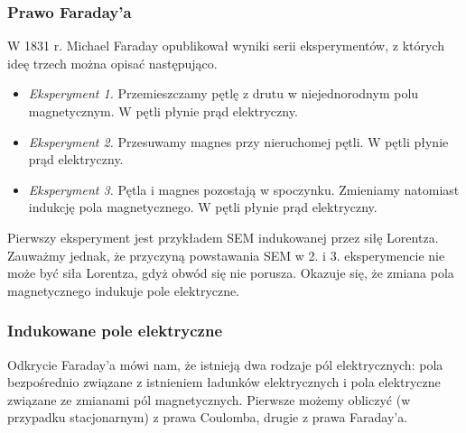 \documentclass[../main.tex]{subfiles}
\begin{document}
    \subsubsection*{Prawo Faraday'a}
    W 1831 r. Michael Faraday opublikował wyniki serii eksperymentów, z których ideę trzech można opisać następująco.
    \begin{itemize}
        \item \textit{Eksperyment 1.} Przemieszczamy pętlę z drutu w niejednorodnym polu magnetycznym. W pętli płynie prąd elektryczny.
        \item \textit{Eksperyment 2.} Przesuwamy magnes przy nieruchomej pętli. W pętli płynie prąd elektryczny.
        \item \textit{Eksperyment 3.} Pętla i magnes pozostają w spoczynku. Zmieniamy natomiast indukcję pola magnetycznego. W pętli płynie prąd elektryczny.
    \end{itemize}
    Pierwszy eksperyment jest przykładem SEM indukowanej przez siłę Lorentza. Zauważmy jednak, że przyczyną powstawania SEM w 2. i 3. eksperymencie nie może być siła Lorentza, gdyż obwód się nie porusza. Okazuje się, że zmiana pola magnetycznego indukuje pole elektryczne.
    \medskip
    
    \noindent{}
\medskip

\noindent{}

\subsubsection*{Indukowane pole elektryczne}
Odkrycie Faraday'a mówi nam, że istnieją dwa rodzaje pól elektrycznych: pola bezpośrednio związane z istnieniem ładunków elektrycznych i pola elektryczne związane ze zmianami pól magnetycznych. Pierwsze możemy obliczyć (w przypadku stacjonarnym) z prawa Coulomba, drugie z prawa Faraday'a.
\end{document}

